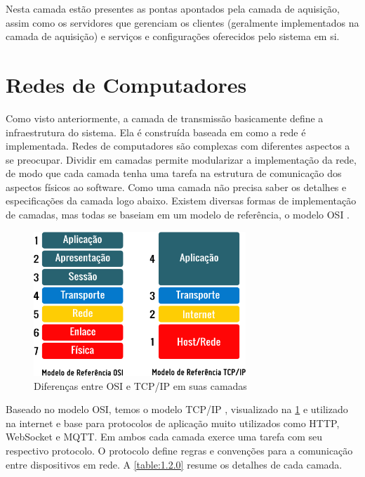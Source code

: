 Nesta camada estão presentes as pontas apontados pela camada de aquisição, assim como os servidores que gerenciam os clientes (geralmente implementados na camada de aquisição) e serviços e configurações oferecidos pelo sistema em si.

\section{Redes de Computadores}
\label{section:camadas_de_rede}

Como visto anteriormente, a camada de transmissão basicamente define a infraestrutura do sistema. Ela é construída baseada em como a rede é implementada. Redes de computadores são complexas com diferentes aspectos a se preocupar. Dividir em camadas permite modularizar a implementação da rede, de modo que cada camada tenha uma tarefa na estrutura de comunicação dos aspectos físicos ao software. Como uma camada  não precisa saber os detalhes e especificações da camada logo abaixo. Existem diversas formas de implementação de camadas, mas todas se baseiam em um modelo de referência, o modelo OSI \cite{Zimmermann:1988:ORM:59309.59310}.


\begin{figure}[h!]
\centering
\includegraphics[width=8cm]{./02_Capitulos/02_Cap1/figures/modelo_osi_tcpip}
\caption{Diferenças entre OSI e TCP/IP em suas camadas}
\label{fig:1.2.0/modelo_osi_tcpip}
\end{figure}

Baseado no modelo OSI, temos o modelo TCP/IP \cite{TCPIP}, visualizado na \ref{fig:1.2.0/modelo_osi_tcpip} e utilizado na internet e base para protocolos de aplicação muito utilizados como HTTP, WebSocket e MQTT. Em ambos cada camada exerce uma tarefa com seu respectivo protocolo. O protocolo define regras e convenções para a comunicação entre dispositivos em rede. A \ref{table:1.2.0} resume os detalhes de cada camada.

